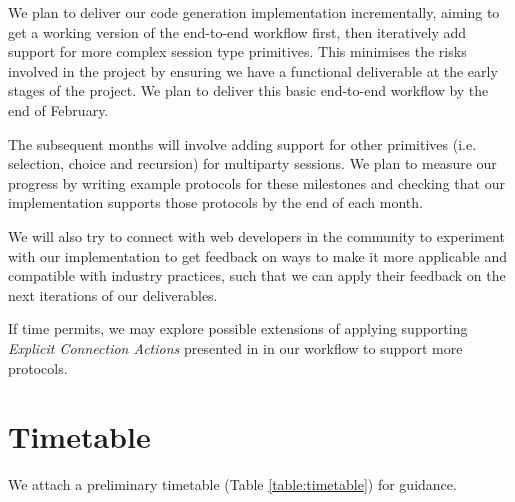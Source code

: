\documentclass[12pt,twoside]{report}
\begin{document}
We plan to deliver our code generation implementation incrementally, aiming to get a working version of the end-to-end workflow first, then iteratively add support for more complex session type primitives. This minimises the risks involved in the project by ensuring we have a functional deliverable at the early stages of the project. We plan to deliver this basic end-to-end workflow by the end of February.

The subsequent months will involve adding support for other primitives (i.e. selection, choice and recursion) for multiparty sessions. We plan to measure our progress by writing example protocols for these milestones and checking that our implementation supports those protocols by the end of each month.

We will also try to connect with web developers in the community to experiment with our implementation to get feedback on ways to make it more applicable and compatible with industry practices, such that we can apply their feedback on the next iterations of our deliverables.

If time permits, we may explore possible extensions of applying supporting \textit{Explicit Connection Actions} presented in \cite{FASE2017} in our workflow to support more protocols.

\section{Timetable}
We attach a preliminary timetable (Table \ref{table:timetable}) for guidance.
\end{document}
